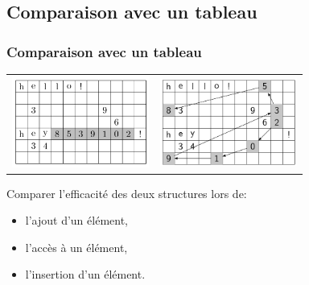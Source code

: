 \documentclass[svgnames,11pt]{beamer}
\begin{document}
\subsection{Comparaison avec un tableau}
\begin{frame}
    \frametitle{Comparaison avec un tableau}


    \begin{center}
        \begin{tabular}{cc}
            \includegraphics[width=4.5cm]{ressources/tab.png}
             &
            \includegraphics[width=4.5cm]{ressources/liste.png}
        \end{tabular}
    \end{center}
    \begin{activite}
        Comparer l'efficacité des deux structures lors de:
        \begin{itemize}
            \item l'ajout d'un élément,
            \item l'accès à un élément,
            \item l'insertion d'un élément.
        \end{itemize}
    \end{activite}
\end{frame}
\end{document}
